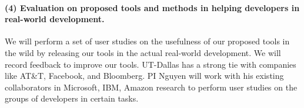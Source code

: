 \paragraph{\bf (4) Evaluation on proposed tools and methods in helping developers in real-world development.}

We will perform a set of user studies on the usefulness of our
proposed tools in the wild by releasing our
tools in the actual real-world development. 
We will record feedback to improve our tools.
UT-Dallas has a strong tie with companies like AT\&T, Facebook, and
Bloomberg. PI Nguyen will work with his existing collaborators in
Microsoft, IBM, Amazon research to perform user studies on the groups of
developers in certain tasks.
